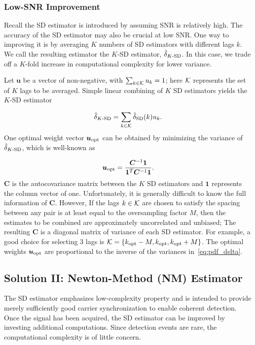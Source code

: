 \subsubsection{Low-SNR Improvement}
Recall the SD estimator is introduced by assuming SNR is relatively high. 
The accuracy of the SD estimator may also be crucial at low SNR.
One way to improving it is by averaging $K$ numbers of SD estimators with different lags $k$.
We call the resulting estimator the $K$-SD estimator, $\hat{\delta}_{K\text{-SD}}$.
In this case, we trade off a $K$-fold increase in computational complexity for lower variance.

Let $\bm{u}$ be a vector of non-negative, with
$\sum_{k \in {\cal K}}u_k=1$; here ${\cal K}$ represents the set of $K$
lags to be averaged.
Simple linear combining of $K$ SD estimators yields the $K$-SD estimator

\begin{equation}
  \label{eq:K_SD_est}
      \hat{\delta}_{K\text{-SD}}=\sum_{k \in \cal K}\hat{\delta}_{\text{SD}}(k)u_k.
\end{equation}
One optimal weight vector $\bm{u}_{\text{opt}}$ can be obtained by minimizing the variance of $\hat{\delta}_{K\text{-SD}}$,
which is well-known as

\begin{equation}
  \label{eq:u_opt}
      \bm{u}_{\text{opt}}=\frac{\bm{C}^{-1}\bm{1}}{\bm{1}^T\bm{C}^{-1}\bm{1}}.
\end{equation}
$\bm{C}$ is the autocovariance matrix between the $K$ SD estimators and $\bm{1}$ represents the column vector of one. 
Unfortunately, it is generally difficult to know the full information of $\bm{C}$. However,
If the lags $k \in {\cal K}$ are chosen to satisfy the spacing between any pair is at least
equal to the oversampling factor $M$, then the estimates to be combined are approximately uncorrelated and unbiased; The  
resulting $\bm{C}$ is a diagonal matrix of variance of each SD estimator. For example, a good choice for selecting 3 lags is 
${\cal K}=\{k_{\text{opt}}-M,k_{\text{opt}},k_{\text{opt}}+M\}$. The optimal weights $\bm{u}_{\text{opt}}$ are proportional to the inverse of the
variances in~\eqref{eq:pdf_delta}.

\subsection{Solution II: Newton-Method (NM) Estimator}

The SD estimator emphasizes low-complexity property and is intended to provide merely sufficiently good carrier synchronization
to enable coherent detection. Once the signal has been acquired, the SD estimator can be improved by 
investing additional computations. Since detection events are rare, the computational complexity is of little concern.

